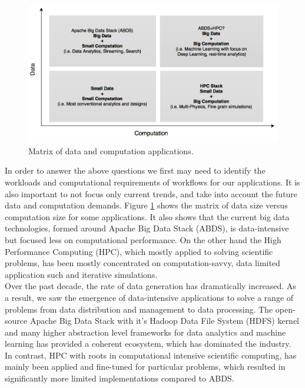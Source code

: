 \documentclass[runningheads,a4paper]{llncs}
\begin{document}
\begin{figure}
\includegraphics[scale=0.31]{./images/BigData_HPC.png}
\centering
\caption{Matrix of data and computation applications.}
\label{fig:bigdata_hpc_matrix}
\end{figure}
In order to answer the above questions we first may need to identify the workloads and computational requirements of workflows for our applications. It is also important to not focus only current trends, and take into account the future data and computation demands. Figure \ref{fig:bigdata_hpc_matrix} shows the matrix of data size versus computation size for some applications. It also shows that the current big data technologies, formed around Apache Big Data Stack (ABDS), is data-intensive but focused less on computational performance. On the other hand the High Performance Computing (HPC), which mostly applied to solving scientific problems, has been mostly concentrated on computation-savvy, data limited application such and iterative simulations.\\

Over the past decade, the rate of data generation has dramatically increased. As a result, we saw the emergence of data-intensive applications to solve a range of problems from data  distribution and management to data processing. The open-source Apache Big Data Stack with it's Hadoop Data File System (HDFS) kernel and many higher abstraction level frameworks for data analytics and machine learning has provided a coherent ecosystem, which has dominated the industry.\\

In contrast, HPC with roots in computational intensive scientific computing, has mainly been applied and fine-tuned for particular problems, which resulted in significantly more limited implementations compared to ABDS.
\end{document}
